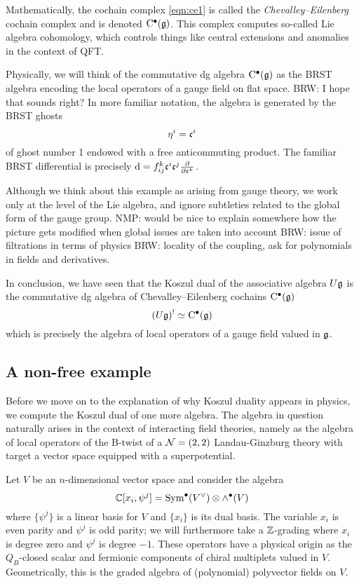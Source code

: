 \documentclass[11pt]{amsart}
\def\brian#1{{\textcolor{blue!65!red}{BRW: {#1}}}}
\def\natalie#1{{\textcolor{green!65!black}{NMP: {#1}}}}
\begin{document}
Mathematically, the cochain complex \eqref{eqn:ce1} is called the {\em Chevalley--Eilenberg} cochain complex and is denoted ${\rm C}^\bullet(\mathfrak g)$. 
This complex computes so-called Lie algebra cohomology, which controls things like central extensions and anomalies in the context of QFT. 

Physically, we will think of the commutative dg algebra ${\rm C}^\bullet(\mathfrak g)$ as the BRST algebra encoding the local operators of a gauge field on flat space. 
\brian{I hope that sounds right?}
In more familiar notation, the algebra is generated by the BRST ghosts 
\[
\eta^i = \mathfrak c^{i}
\]
of ghost number 1 endowed with a free anticommuting product.
The familiar BRST differential is precisely ${\rm d} = f_{ij}^k \mathfrak c^i \mathfrak c^j \frac{\partial}{\partial \mathfrak c^k}$.

Although we think about this example as arising from gauge theory, we work only at the level of the Lie algebra, and ignore subtleties related to the global form of the gauge group. \natalie{would be nice to explain somewhere how the picture gets modified when global issues are taken into account} 
\brian{issue of filtrations in terms of physics}
\brian{locality of the coupling, ask for polynomials in fields and derivatives.}

In conclusion, we have seen that the Koszul dual of the associative algebra $U \mathfrak g$ is the commutative dg algebra of Chevalley--Eilenberg cochains ${\rm C}^\bullet(\mathfrak g)$
\[
(U \mathfrak g)^! \simeq {\rm C}^\bullet (\mathfrak g) 
\]
which is precisely the algebra of local operators of a gauge field valued in $\mathfrak g$. 

\subsection{A non-free example} 
\label{sec:LG1}

Before we move on to the explanation of why Koszul duality appears in physics, we compute the Koszul dual of one more algebra. The algebra in question naturally arises in the context of interacting field theories, namely as the algebra of local operators of the B-twist of a $\mathcal N = (2,2)$ Landau-Ginzburg theory with target a vector space equipped with a superpotential.

Let $V$ be an $n$-dimensional vector space and consider the algebra 
\[
\mathbb C[x_i, \psi^j] = \operatorname{Sym}^\bullet (V^\vee) \otimes \wedge^\bullet(V) 
\]
where $\{\psi^j\}$ is a linear basis for $V$ and $\{x_i\}$ is its dual basis.
The variable $x_i$ is even parity and $\psi^j$ is odd parity; we will furthermore take a $\mathbb Z$-grading where $x_i$ is degree zero and $\psi^j$ is degree $-1$. These operators have a physical origin as the $Q_B$-closed scalar and fermionic components of chiral multiplets valued in $V$.
Geometrically, this is the graded algebra of (polynomial) polyvector fields on $V$.
\end{document}
